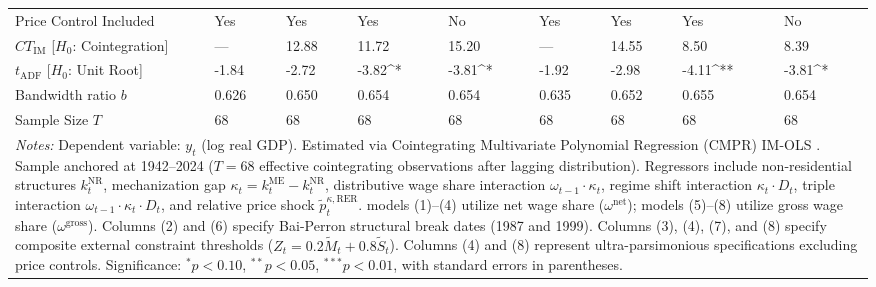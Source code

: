 \begin{table}[h!]
\begin{tabular}{p{3.5cm}p{1.35cm}p{1.35cm}p{1.35cm}p{1.35cm}p{1.35cm}p{1.35cm}p{1.35cm}p{1.35cm}}
Price Control Included & Yes & Yes & Yes & No & Yes & Yes & Yes & No \\
$CT_{\text{IM}}$ [$H_0$: Cointegration] & — & 12.88 & 11.72 & 15.20 & — & 14.55 & 8.50 & 8.39 \\
$t_{\text{ADF}}$ [$H_0$: Unit Root] & -1.84 & -2.72 & -3.82^{*} & -3.81^{*} & -1.92 & -2.98 & -4.11^{**} & -3.81^{*} \\
Bandwidth ratio $b$ & 0.626 & 0.650 & 0.654 & 0.654 & 0.635 & 0.652 & 0.655 & 0.654 \\
Sample Size $T$ & 68 & 68 & 68 & 68 & 68 & 68 & 68 & 68 \\
		\bottomrule
		\multicolumn{9}{p{14.3cm}}{\footnotesize \textit{Notes:} Dependent variable: $y_t$ (log real GDP). Estimated via Cointegrating Multivariate Polynomial Regression (CMPR) IM-OLS \citep{VogelsangWagner2024}. Sample anchored at 1942--2024 ($T=68$ effective cointegrating observations after lagging distribution). Regressors include non-residential structures $k_t^{\text{NR}}$, mechanization gap $\kappa_t = k_t^{\text{ME}} - k_t^{\text{NR}}$, distributive wage share interaction $\omega_{t-1} \cdot \kappa_t$, regime shift interaction $\kappa_t \cdot D_t$, triple interaction $\omega_{t-1} \cdot \kappa_t \cdot D_t$, and relative price shock $\tilde{p}_t^{\kappa, \text{RER}}$. models (1)--(4) utilize net wage share ($\omega^{\text{net}}$); models (5)--(8) utilize gross wage share ($\omega^{\text{gross}}$). Columns (2) and (6) specify Bai-Perron structural break dates (1987 and 1999). Columns (3), (4), (7), and (8) specify composite external constraint thresholds ($Z_t = 0.2 \tilde{M}_t + 0.8 \tilde{S}_t$). Columns (4) and (8) represent ultra-parsimonious specifications excluding price controls. Significance: $^*p<0.10$, $^{**}p<0.05$, $^{***}p<0.01$, with standard errors in parentheses.} \\
	\end{tabular}
\end{table}